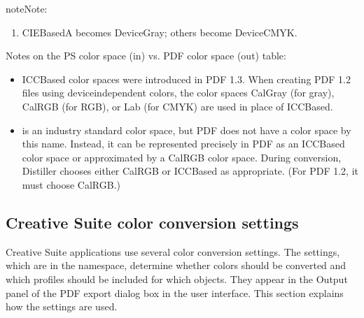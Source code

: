 \documentclass[letterpaper,12pt,english,openany,oneside]{sphinxmanual}
\begin{document}
\begin{sphinxadmonition}{note}{Note:}\begin{enumerate}
%
\item {} 
CIEBasedA becomes DeviceGray; others become DeviceCMYK.

\end{enumerate}
\end{sphinxadmonition}

Notes on the PS color space (in) vs. PDF color space (out) table:
\begin{itemize}
\item {} 
ICCBased color spaces were introduced in PDF 1.3. When creating PDF 1.2 files using device\sphinxhyphen{}independent colors, the color spaces CalGray (for gray), CalRGB (for RGB), or Lab (for CMYK) are used in place of ICCBased.

\item {} 
 is an industry standard color space, but PDF does not have a color space by this name. Instead, it can be represented precisely in PDF as an ICCBased color space or approximated by a CalRGB color space. During conversion, Distiller chooses either CalRGB or ICCBased as appropriate. (For PDF 1.2, it must choose CalRGB.)

\end{itemize}




\subsection{Creative Suite color conversion settings}
\label{\detokenize{PDF_Create_UsingSettings:creative-suite-color-conversion-settings}}
Creative Suite applications use several color conversion settings. The settings, which are in the  namespace, determine whether colors should be converted and which profiles should be included for which objects. They appear in the Output panel of the PDF export dialog box in the user interface. This section explains how the settings are used.
\end{document}
